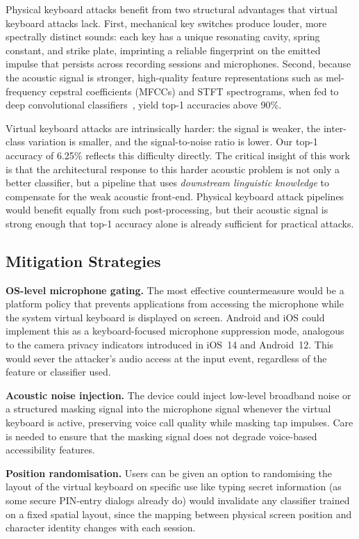 \documentclass[conference]{IEEEtran}
\begin{document}
Physical keyboard attacks benefit from two structural advantages
that virtual keyboard attacks lack.
First, mechanical key switches produce louder, more spectrally
distinct sounds: each key has a unique resonating cavity, spring
constant, and strike plate, imprinting a reliable fingerprint on
the emitted impulse that persists across recording sessions and
microphones.
Second, because the acoustic signal is stronger, high-quality
feature representations such as mel-frequency cepstral coefficients
(MFCCs) and STFT spectrograms, when fed to deep convolutional
classifiers~\cite{harrison2023deep}, yield top-1 accuracies above 90\%.

Virtual keyboard attacks are intrinsically harder: the signal is
weaker, the inter-class variation is smaller, and the signal-to-noise
ratio is lower.
Our top-1 accuracy of 6.25\% reflects this difficulty directly.
The critical insight of this work is that the architectural response
to this harder acoustic problem is not only a better classifier, but
a pipeline that uses \emph{downstream linguistic knowledge} to
compensate for the weak acoustic front-end.
Physical keyboard attack pipelines would benefit equally from
such post-processing, but their acoustic signal is strong enough
that top-1 accuracy alone is already sufficient for practical
attacks.

\subsection{Mitigation Strategies}

\textbf{OS-level microphone gating.}
The most effective countermeasure would be a platform policy that
prevents applications from accessing the microphone while the
system virtual keyboard is displayed on screen.
Android and iOS could implement this as a keyboard-focused
microphone suppression mode, analogous to the camera privacy
indicators introduced in iOS~14 and Android~12.
This would sever the attacker's audio access at the input event,
regardless of the feature or classifier used.

\textbf{Acoustic noise injection.}
The device could inject low-level broadband noise or a structured
masking signal into the microphone signal whenever the virtual
keyboard is active, preserving voice call quality while masking
tap impulses.
Care is needed to ensure that the masking signal does not degrade
voice-based accessibility features.

\textbf{Position randomisation.}
Users can be given an option to randomising the layout of the virtual keyboard on specific use like typing secret information (as some secure PIN-entry dialogs already do) would invalidate any
classifier trained on a fixed spatial layout, since the mapping
between physical screen position and character identity changes
with each session.
\end{document}
